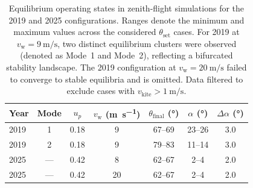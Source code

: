 \begin{table}[htbp]
\centering
\caption{Equilibrium operating states in zenith-flight simulations for the 2019 and 2025 configurations. Ranges denote the minimum and maximum values across the considered $\theta_{\mathrm{set}}$ cases. For 2019 at $v_{\mathrm{w}}=9~\unit{\metre\per\second}$, two distinct equilibrium clusters were observed (denoted as Mode~1 and Mode~2), reflecting a bifurcated stability landscape. The 2019 configuration at $v_{\mathrm{w}}=20~\unit{\metre\per\second}$ failed to converge to stable equilibria and is omitted. Data filtered to exclude cases with $v_{\mathrm{kite}} > 1~\unit{\metre\per\second}$.}
\label{tab:zenith_circle_comparison}
\small
\setlength{\tabcolsep}{4pt}
\renewcommand{\arraystretch}{1.05}
\begin{tabular}{lcccccc}
\toprule
Year & Mode & $u_p$ & $v_{\mathrm{w}}$ (\unit{\metre\per\second}) & $\theta_{\mathrm{final}}$ (\unit{\degree}) & $\alpha$ (\unit{\degree}) & $\Delta\alpha$ (\unit{\degree}) \\
\midrule
2019 & 1 & 0.18 & 9  & 67--69 & 23--26 & 3.0 \\
2019 & 2 & 0.18 & 9  & 79--83 & 11--14 & 3.0 \\
2025 & --- & 0.42 & 8  & 62--67 & 2--4 & 2.0 \\
2025 & --- & 0.42 & 20 & 62--67 & 2--4 & 2.0 \\
\bottomrule
\end{tabular}
\end{table}
